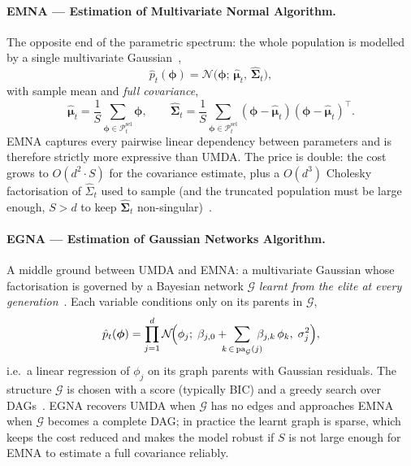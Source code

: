 \paragraph*{EMNA --- Estimation of Multivariate Normal Algorithm.}
The opposite end of the parametric spectrum: the whole population is
modelled by a single multivariate Gaussian~\cite{larranaga2002eda},
\[
    \hat{p}_t(\boldsymbol{\phi}) =
    \mathcal{N}\!\bigl(\boldsymbol{\phi};\,
    \hat{\boldsymbol{\mu}}_t,\,
    \hat{\boldsymbol{\Sigma}}_t\bigr),
\]
with sample mean and \emph{full covariance},
\[
    \hat{\boldsymbol{\mu}}_t
    = \frac{1}{S}\!\sum_{\boldsymbol{\phi}\in\mathcal{P}_t^{\text{sel}}}\!\boldsymbol{\phi},
    \qquad
    \hat{\boldsymbol{\Sigma}}_t
    = \frac{1}{S}\!\sum_{\boldsymbol{\phi}\in\mathcal{P}_t^{\text{sel}}}\!
    (\boldsymbol{\phi} - \hat{\boldsymbol{\mu}}_t)
    (\boldsymbol{\phi} - \hat{\boldsymbol{\mu}}_t)^{\!\top}.
\]
EMNA captures every pairwise linear dependency between parameters and
is therefore strictly more expressive than UMDA. The price is
double: the cost grows to $O(d^{2}\cdot S)$ for the covariance estimate,
plus a $O(d^{3})$ Cholesky factorisation of $\hat{\Sigma}_t$ used to sample (and the
truncated population must be large enough, $S>d$
to keep $\hat{\boldsymbol{\Sigma}}_t$
non-singular)~\cite{larranaga2002eda}.

\paragraph*{EGNA --- Estimation of Gaussian Networks Algorithm.}
A middle ground between UMDA and EMNA: a multivariate Gaussian whose
factorisation is governed by a Bayesian network $\mathcal{G}$
\emph{learnt from the elite at every
generation}~\cite{larranaga2002eda}. Each variable conditions only
on its parents in $\mathcal{G}$,
\[
    \hat{p}_t(\boldsymbol{\phi}) = \prod_{j=1}^{d}
    \mathcal{N}\!\Bigl(\phi_j;\;
    \beta_{j,0} + \!\!\!\!\sum_{k\,\in\,\mathrm{pa}_{\mathcal{G}}(j)}\!\!\!\!
    \beta_{j,k}\,\phi_k,\;
    \sigma_j^{2}\Bigr),
\]
i.e.\ a linear regression of $\phi_j$ on its graph parents with
Gaussian residuals. The structure $\mathcal{G}$ is chosen with a
score (typically BIC) and a greedy search over
DAGs~\cite{larranaga2002eda}. EGNA recovers UMDA when $\mathcal{G}$
has no edges and approaches EMNA when $\mathcal{G}$ becomes a
complete DAG; in practice the learnt graph is sparse, which keeps
the cost reduced and makes the model robust if 
$S$ is not large enough for EMNA to estimate a full covariance
reliably.

